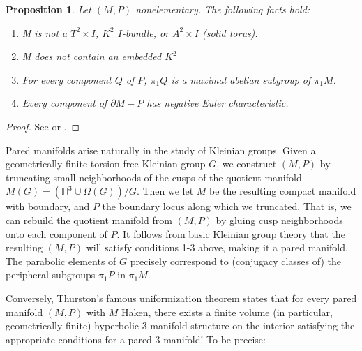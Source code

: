 \documentclass[12pt]{amsart}
\newtheorem{prop}[theorem]{Proposition}
\theoremstyle{definition}
\theoremstyle{remark}
\newcommand{\x}{\times}
\newcommand{\bd}{\partial}
\newcommand{\Om}{\Omega}
\begin{document}
\begin{prop}

Let $(M,P)$ nonelementary. The following facts hold:

\begin{enumerate}
\item M is not a $T^2\x I$, $K^2$ $I$-bundle, or $A^2\x I$ (solid torus).
\item M does not contain an embedded $K^2$
\item For every component $Q$ of $P$, $\pi_1Q$ is a maximal abelian subgroup of
$\pi_1M$.
\item Every component of $\bd M-P$ has negative Euler characteristic.
\end{enumerate}

\end{prop}
\begin{proof}
See \cite{CMc} or \cite{Mo}.
\end{proof}

Pared manifolds arise naturally in the study of Kleinian groups. Given
a geometrically finite torsion-free Kleinian group $G$, we construct $(M,P)$ by
truncating small neighborhoods of the cusps of the quotient manifold $M(G)
= \left(\mathbb{H}^3\cup \Om(G)\right)/G$.  Then we let $M$ be the resulting
compact manifold with boundary, and $P$ the boundary locus along which we
truncated.  That is, we can rebuild the quotient manifold from $(M,P)$ by
gluing cusp neighborhoods onto each component of $P$. It follows from basic
Kleinian group theory that the resulting $(M,P)$ will satisfy conditions 1-3
above, making it a pared manifold.  The parabolic elements of $G$ precisely
correspond to (conjugacy classes of) the peripheral subgroups $\pi_1P$ in
$\pi_1M$.

Conversely, Thurston's famous uniformization theorem states that for every
pared manifold $(M,P)$ with $M$ Haken, there exists a finite volume (in
particular, geometrically finite) hyperbolic 3-manifold structure on the
interior satisfying the appropriate conditions for a pared 3-manifold! To be
precise:

\end{document}
